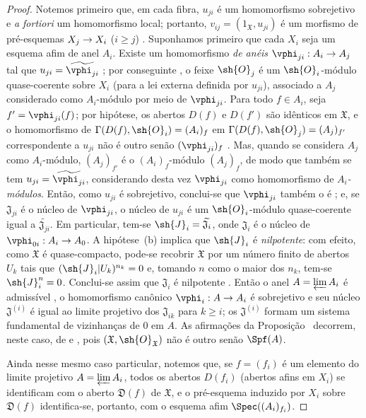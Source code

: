 \documentclass[oneside]{amsart}
\makeatletter
\renewcommand{\geq}{\geqslant}
\newcommand{\ega@arrow}[2]{\mathchoice{#1}{#2}{#2}{#2}}
\renewcommand{\to}{\ega@arrow{\longrightarrow}{\rightarrow}}
\makeatother
\begin{document}
\begin{proof}
Notemos primeiro que, em cada fibra, $u_{ji}$ é um homomorfismo sobrejetivo e \emph{a fortiori} um homomorfismo local; portanto, $v_{ij}=(1_\mathfrak{X},u_{ji})$ é um morfismo de pré-esquemas $X_j\to X_i$ ($i\geq j$) .
Suponhamos primeiro que cada $X_i$ seja um esquema afim de anel $A_i$.
Existe um homomorfismo \emph{de anéis} $\vphi_{ji}:A_i\to A_j$ tal que $u_{ji}=\widetilde{\vphi_{ji}}$ ; por conseguinte , o feixe $\sh{O}_j$ é um $\sh{O}_i$-módulo quase-coerente sobre $X_i$ (para a lei externa definida por $u_{ji}$), associado a $A_j$ considerado como $A_i$-módulo por meio de $\vphi_{ji}$.
Para todo $f\in A_i$, seja $f'=\vphi_{ji}(f)$; por hipótese, os abertos $D(f)$ e $D(f')$ são idênticos em $\mathfrak{X}$, e o homomorfismo de $\Gamma(D(f),\sh{O}_i)=(A_i)_f$ em $\Gamma(D(f),\sh{O}_j)=(A_j)_{f'}$ correspondente a $u_{ji}$ não é outro senão $(\vphi_{ji})_f$ .
Mas, quando se considera $A_j$ como $A_i$-módulo, $(A_j)_{f'}$ é o $(A_i)_f$-módulo $(A_j)_f$, de modo que também se tem $u_{ji}=\widetilde{\vphi_{ji}}$, considerando desta vez $\vphi_{ji}$ como homomorfismo de \emph{$A_i$-módulos}.
Então, como $u_{ji}$ é sobrejetivo, conclui-se que $\vphi_{ji}$ também o é ; e, se $\mathfrak{J}_{ji}$ é o núcleo de $\vphi_{ji}$, o núcleo de $u_{ji}$ é um $\sh{O}_i$-módulo quase-coerente igual a $\widetilde{\mathfrak{J}_{ji}}$.
Em particular, tem-se $\sh{J}_i=\widetilde{\mathfrak{J}_i}$, onde $\mathfrak{J}_i$ é o núcleo de $\vphi_{0i}:A_i\to A_0$.
A hipótese~(b) implica que $\sh{J}_i$ é \emph{nilpotente}: com efeito, como $\mathfrak{X}$ é quase-compacto, pode-se recobrir $\mathfrak{X}$ por um número finito de abertos $U_k$ tais que $(\sh{J}_i|U_k)^{n_k}=0$ e, tomando $n$ como o maior dos $n_k$, tem-se $\sh{J}_i^n=0$.
Conclui-se assim que $\mathfrak{J}_i$ é nilpotente .
Então o anel $A=\varprojlim A_i$ é admissível , o homomorfismo canônico $\vphi_i:A\to A_i$ é sobrejetivo e seu núcleo $\mathfrak{J}^{(i)}$ é igual ao limite projetivo dos $\mathfrak{J}_{ik}$ para $k\geq i$; os $\mathfrak{J}^{(i)}$ formam um sistema fundamental de vizinhanças de $0$ em $A$.
As afirmações da Proposição~ decorrem, neste caso, de  e , pois $(\mathfrak{X},\sh{O}_\mathfrak{X})$ não é outro senão $\Spf(A)$.

Ainda nesse mesmo caso particular, notemos que, se $f=(f_i)$ é um elemento do limite projetivo $A=\varprojlim A_i$, todos os abertos $D(f_i)$ (abertos afins em $X_i$) se identificam com o aberto $\mathfrak{D}(f)$ de $\mathfrak{X}$, e o pré-esquema induzido por $X_i$ sobre $\mathfrak{D}(f)$ identifica-se, portanto, com o esquema afim $\Spec((A_i)_{f_i})$.


\end{proof}
\end{document}
